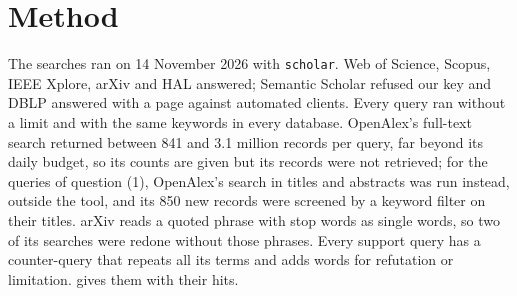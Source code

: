 \section{Method}
\label{sec:komplement-method}

The searches ran on 14 November 2026 with \texttt{scholar}.  Web of
Science, Scopus, IEEE Xplore, arXiv and HAL answered; Semantic Scholar
refused our key and DBLP answered with a page against automated clients.
Every query ran without a limit and with the same keywords in every
database.  OpenAlex's full-text search returned between 841 and 3.1
million records per query, far beyond its daily budget, so its counts are
given but its records were not retrieved; for the queries of question
(1), OpenAlex's search in titles and abstracts was run instead, outside
the tool, and its 850 new records were screened by a keyword filter on
their titles.  arXiv reads a quoted phrase with stop words as single
words, so two of its searches were redone without those phrases.  Every
support query has a counter-query that repeats all its terms and adds
words for refutation or limitation.  
gives them with their hits.

